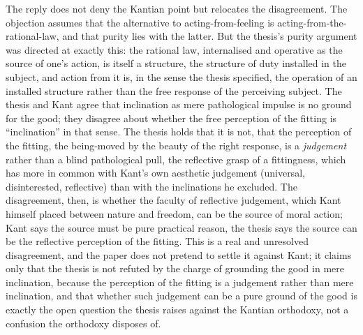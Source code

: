 The reply does not deny the Kantian point but relocates the disagreement. The objection assumes that the alternative to acting-from-feeling is acting-from-the-rational-law, and that purity lies with the latter. But the thesis's purity argument was directed at exactly this: the rational law, internalised and operative as the source of one's action, is itself a structure, the structure of duty installed in the subject, and action from it is, in the sense the thesis specified, the operation of an installed structure rather than the free response of the perceiving subject. The thesis and Kant agree that inclination as mere pathological impulse is no ground for the good; they disagree about whether the free perception of the fitting is ``inclination'' in that sense. The thesis holds that it is not, that the perception of the fitting, the being-moved by the beauty of the right response, is a \emph{judgement} rather than a blind pathological pull, the reflective grasp of a fittingness, which has more in common with Kant's own aesthetic judgement (universal, disinterested, reflective) than with the inclinations he excluded. The disagreement, then, is whether the faculty of reflective judgement, which Kant himself placed between nature and freedom, can be the source of moral action; Kant says the source must be pure practical reason, the thesis says the source can be the reflective perception of the fitting. This is a real and unresolved disagreement, and the paper does not pretend to settle it against Kant; it claims only that the thesis is not refuted by the charge of grounding the good in mere inclination, because the perception of the fitting is a judgement rather than mere inclination, and that whether such judgement can be a pure ground of the good is exactly the open question the thesis raises against the Kantian orthodoxy, not a confusion the orthodoxy disposes of.

